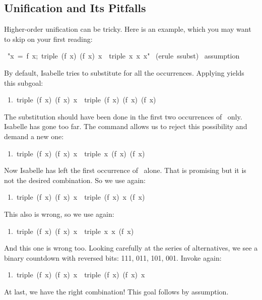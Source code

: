 \subsection{Unification and Its Pitfalls}

Higher-order unification can be tricky.  Here is an example, which you may
want to skip on your first reading:
\begin{isabelle}
\ "\isasymlbrakk x\ =\
f\ x;\ triple\ (f\ x)\ (f\ x)\ x\isasymrbrakk\
\isasymLongrightarrow\ triple\ x\ x\ x"\isanewline
\isacommand{apply}\ (erule\ ssubst)\isanewline
{}\isanewline
{}\isanewline
\isacommand{back}\isanewline
\isacommand{back}\isanewline
{}\ assumption\isanewline
\isacommand{done}
\end{isabelle}
%
By default, Isabelle tries to substitute for all the 
occurrences.  Applying  yields this subgoal:
\begin{isabelle}
\ 1.\ triple\ (f\ x)\ (f\ x)\ x\ \isasymLongrightarrow\ triple\ (f\ x)\ (f\ x)\ (f\ x)
\end{isabelle}
The substitution should have been done in the first two occurrences 
of~\isa{x} only. Isabelle has gone too far. The 
command allows us to reject this possibility and demand a new one: 
\begin{isabelle}
\ 1.\ triple\ (f\ x)\ (f\ x)\ x\ \isasymLongrightarrow\ triple\ x\ (f\ x)\ (f\ x)
\end{isabelle}
%
Now Isabelle has left the first occurrence of~ alone. That is 
promising but it is not the desired combination. So we use  
again:
\begin{isabelle}
\ 1.\ triple\ (f\ x)\ (f\ x)\ x\ \isasymLongrightarrow\ triple\ (f\ x)\ x\ (f\ x)
\end{isabelle}
%
This also is wrong, so we use  again: 
\begin{isabelle}
\ 1.\ triple\ (f\ x)\ (f\ x)\ x\ \isasymLongrightarrow\ triple\ x\ x\ (f\ x)
\end{isabelle}
%
And this one is wrong too. Looking carefully at the series 
of alternatives, we see a binary countdown with reversed bits: 111,
011, 101, 001.  Invoke \isacommand{back} again: 
\begin{isabelle}
\ 1.\ triple\ (f\ x)\ (f\ x)\ x\ \isasymLongrightarrow\ triple\ (f\ x)\ (f\ x)\ x%
\end{isabelle}
At last, we have the right combination!  This goal follows by assumption.%

